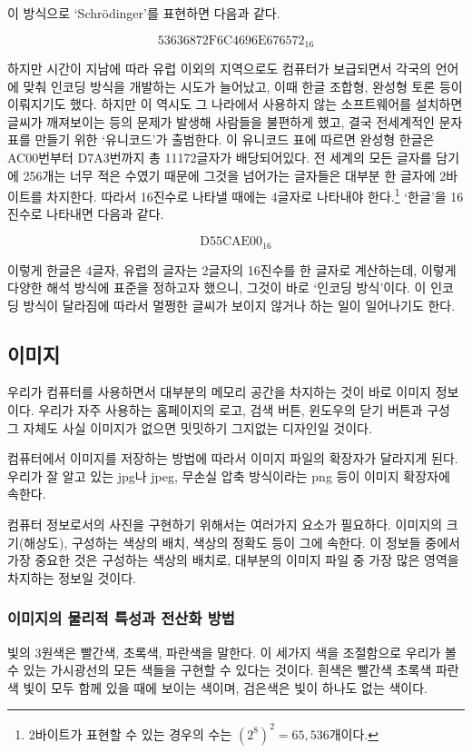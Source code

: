 \documentclass{article}
\begin{document}
이 방식으로 `Schrödinger'를 표현하면 다음과 같다.

$$
\text{53636872F6C4696E676572}_{16}
$$

하지만 시간이 지남에 따라 유럽 이외의 지역으로도 컴퓨터가 보급되면서 각국의 언어에 맞춰 인코딩
방식을 개발하는 시도가 늘어났고, 이때 한글 조합형, 완성형 토론 등이 이뤄지기도 했다.
하지만 이 역시도 그 나라에서 사용하지 않는 소프트웨어를 설치하면 글씨가 깨져보이는 등의 문제가
발생해 사람들을 불편하게 했고, 결국 전세계적인 문자 표를 만들기 위한 `유니코드'가 출범한다.
이 유니코드 표에 따르면 완성형 한글은 AC00번부터 D7A3번까지 총 11172글자가 배당되어있다.
전 세계의 모든 글자를 담기에 256개는 너무 적은 수였기 때문에 그것을 넘어가는 글자들은 대부분
한 글자에 2바이트를 차지한다. 따라서 16진수로 나타낼 때에는 4글자로 나타내야
한다.\footnote{2바이트가 표현할 수 있는 경우의 수는 $(2^8)^2 = 65,536$개이다.}
`한글'을 16진수로 나타내면 다음과 같다.

$$
\text{D55CAE00}_{16}
$$

이렇게 한글은 4글자, 유럽의 글자는 2글자의 16진수를 한 글자로 계산하는데, 이렇게 다양한
해석 방식에 표준을 정하고자 했으니, 그것이 바로 `인코딩 방식'이다. 이 인코딩 방식이 달라짐에
따라서 멀쩡한 글씨가 보이지 않거나 하는 일이 일어나기도 한다.

\subsection{이미지}

우리가 컴퓨터를 사용하면서 대부분의 메모리 공간을 차지하는 것이 바로 이미지 정보이다.
우리가 자주 사용하는 홈페이지의 로고, 검색 버튼, 윈도우의 닫기 버튼과 구성 그 자체도
사실 이미지가 없으면 밋밋하기 그지없는 디자인일 것이다.

컴퓨터에서 이미지를 저장하는 방법에 따라서 이미지 파일의 확장자가 달라지게 된다.
우리가 잘 알고 있는 jpg나 jpeg, 무손실 압축 방식이라는 png 등이 이미지 확장자에 속한다.

컴퓨터 정보로서의 사진을 구현하기 위해서는 여러가지 요소가 필요하다.
이미지의 크기(해상도), 구성하는 색상의 배치, 색상의 정확도 등이 그에 속한다.
이 정보들 중에서 가장 중요한 것은 구성하는 색상의 배치로,
대부분의 이미지 파일 중 가장 많은 영역을 차지하는 정보일 것이다.

\subsubsection{이미지의 물리적 특성과 전산화 방법}

빛의 3원색은 빨간색, 초록색, 파란색을 말한다. 이 세가지 색을 조절함으로 우리가 볼 수 있는
가시광선의 모든 색들을 구현할 수 있다는 것이다. 흰색은 빨간색 초록색 파란색 빛이 모두 함께 있을 때에
보이는 색이며, 검은색은 빛이 하나도 없는 색이다.
\end{document}
